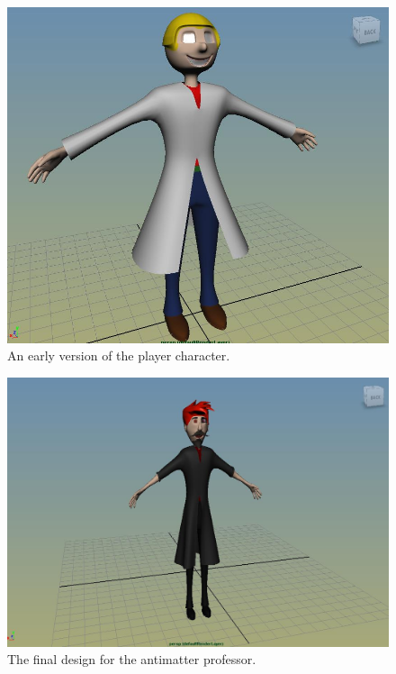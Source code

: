 \documentclass[a4paper,oneside]{memoir}
\begin{document}
	\begin{figure}[ht]
		\begin{center}
			\includegraphics[width=150mm]{../Screenshots/Appendices/player-early}
			\caption{An early version of the player character.}
		\end{center}
	\end{figure}

	\begin{figure}[ht]
		\begin{center}
			\includegraphics[width=150mm]{../Screenshots/Appendices/final-player-evil}
			\caption{The final design for the antimatter professor.}
		\end{center}
	\end{figure}
\end{document}
